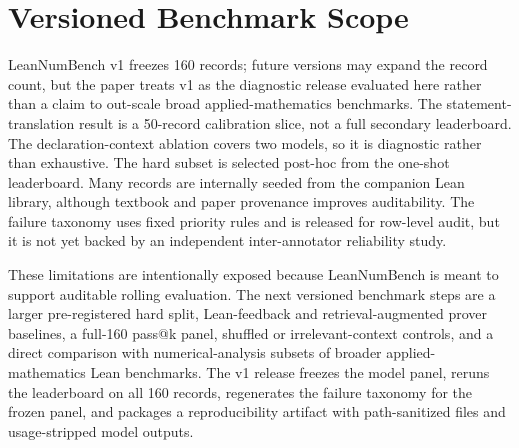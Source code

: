 \section{Versioned Benchmark Scope}

LeanNumBench v1 freezes 160 records; future versions may expand the record
count, but the paper treats v1 as the diagnostic release evaluated here rather
than a claim to out-scale broad applied-mathematics benchmarks. The
statement-translation result is a 50-record calibration slice, not a full
secondary leaderboard. The declaration-context ablation covers two models, so
it is diagnostic rather than exhaustive. The hard subset is selected post-hoc
from the one-shot leaderboard. Many records are internally seeded from the
companion Lean library, although textbook and paper provenance improves
auditability. The failure taxonomy uses fixed priority rules and is released
for row-level audit, but it is not yet backed by an independent
inter-annotator reliability study.

These limitations are intentionally exposed because LeanNumBench is meant to
support auditable rolling evaluation. The next versioned benchmark steps are a
larger pre-registered hard split, Lean-feedback and retrieval-augmented prover
baselines, a full-160 pass@k panel, shuffled or irrelevant-context controls,
and a direct comparison with numerical-analysis subsets of broader
applied-mathematics Lean benchmarks. The v1 release freezes the model panel,
reruns the leaderboard on all 160 records, regenerates the failure taxonomy
for the frozen panel, and packages a reproducibility artifact with
path-sanitized files and usage-stripped model outputs.

